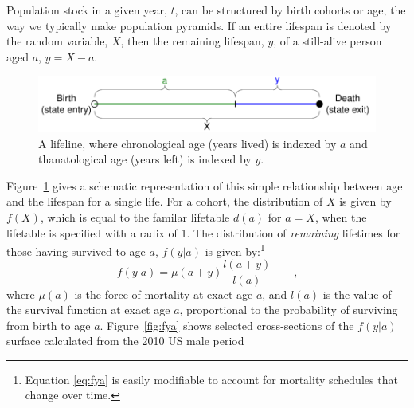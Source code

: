 \documentclass{article}
\newcommand{\tc}{\quad\quad\text{,}}
\begin{document}

Population stock in a
 given year, $t$, can be structured by birth cohorts or age, the way we typically make 
 population pyramids. If an entire lifespan is denoted by the random variable,
 $X$, then the remaining lifespan, $y$, of a still-alive person aged $a$, $y = X - a$.
\begin{figure}[h]
\centering
	\caption{A lifeline, where chronological age (years lived) is indexed by $a$
	and thanatological age (years left) is indexed by $y$.}
	\label{fig:line}
	\includegraphics[scale=.8]{Figures/LifeLine.pdf}	
\end{figure}
Figure~\ref{fig:line} gives a schematic representation of this simple
relationship between age and the lifespan for a single life.
For a cohort, the distribution of $X$ is given by $f(X)$, which is equal to the familar lifetable
$d(a)$ for $a = X$, when the lifetable is specified with a radix of 1. The
distribution of \textit{remaining} lifetimes for those having survived to age $a$, $f(y|a)$ is
given by:\footnote{Equation \eqref{eq:fya} is easily modifiable to account for
mortality schedules that change over time.}
\begin{equation}
\label{eq:fya}
f(y|a) = \mu(a+y) \frac{l(a+y)}{l(a)} \tc
\end{equation}
where $\mu(a)$ is the force of mortality at exact age $a$, and $l(a)$ is
the value of the survival function at exact age $a$, proportional to the
probability of surviving from birth to age $a$. Figure~\ref{fig:fya} shows selected
cross-sections of the $f(y|a)$ surface calculated from the 2010 US male period
\end{document}

